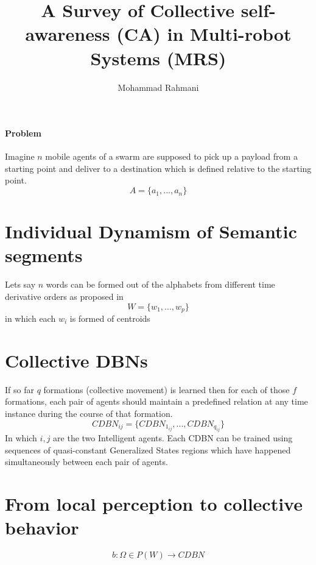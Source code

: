 \documentclass{article}
\begin{document}
	
	\title{A Survey of Collective self-awareness (CA) in Multi-robot Systems (MRS)}
	\author{Mohammad Rahmani}
	\date{}
	\maketitle
	\paragraph{Problem}
	Imagine $n$ mobile agents of a swarm are supposed to pick up a payload from a starting point and deliver to a destination which is defined relative to the starting point. 
	\begin{equation}
		A = \{a_1,...,a_n\}
	\end{equation}
	
	\section{Individual Dynamism of Semantic segments} Lets say $n$ words can be formed out of the alphabets from different time derivative  orders as proposed in \cite{kanapram-2020-collective-awareness-for-abnormality-detection-in-connected-autonomous-vehicles}
	\begin{equation}
		W = \{w_1,...,w_p\}
		\label{eq:words}
	\end{equation}
	in which each $w_i$ is formed of centroids  
	
	\section{Collective DBNs}
	If so far $q$ formations (collective movement) is learned then for each of those $f$ formations, each pair of agents should maintain a predefined relation at any time instance during the course of that formation.  
	\begin{equation}
		CDBN_{ij} = \{CDBN_{1_{ij}},...,CDBN_{q_{ij}}\}
		\label{collective_dbns}
	\end{equation}
	In which $i,j$ are the two Intelligent agents. Each CDBN can be trained using sequences of quasi-constant Generalized States regions which have happened simultaneously between each pair of agents.
	
	\section{From local perception to collective behavior}
	\begin{equation}
		b: \Omega \in P(W) \longrightarrow CDBN
	\end{equation}
	
\end{document}
